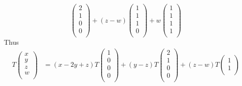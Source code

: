 \documentclass{eh-homework}
\begin{document}
\begin{question}{3}
\[\begin{pmatrix}
                2 \\
                1 \\
                0 \\
                0 \\
           \end{pmatrix}
            +(z - w)
            \begin{pmatrix}
                1 \\
                1 \\
                1 \\
                0 \\
           \end{pmatrix}
           +
            w\begin{pmatrix}
                1 \\
                1 \\
                1 \\
                1 \\
           \end{pmatrix}
        \]
        Thus
        \begin{align*}
            T \begin{pmatrix}
                 x \\
                 y \\
                 z \\
                 w \\
            \end{pmatrix}
            &=
            (x - 2y + z)
            T\begin{pmatrix}
                1 \\
                0 \\
                0 \\
                0 \\
            \end{pmatrix}
            +(y - z)
            T\begin{pmatrix}
                2 \\
                1 \\
                0 \\
                0 \\
            \end{pmatrix}
            +(z - w)
            T\begin{pmatrix}
                1 \\
                1 \\

\end{pmatrix}
\end{align*}
\end{question}
\end{document}
